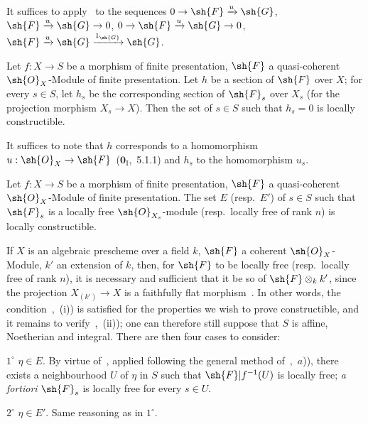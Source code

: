 It suffices to apply~ to the sequences $0\to\sh{F}\xrightarrow{u}\sh{G}$, $\sh{F}\xrightarrow{u}\sh{G}\to 0$, $0\to\sh{F}\xrightarrow{u}\sh{G}\to 0$, $\sh{F}\xrightarrow{u}\sh{G}\xrightarrow{1_\sh{G}}\sh{G}$.

\begin{corollary}[9.4.6]
\label{IV.9.4.6}
Let $f:X\to S$ be a morphism of finite presentation, $\sh{F}$ a quasi-coherent $\sh{O}_X$-Module of finite presentation.
Let $h$ be a section of $\sh{F}$ over $X$; for every $s\in S$, let $h_s$ be the corresponding section of $\sh{F}_s$ over $X_s$ \textnormal{(}for the projection morphism $X_s\to X$\textnormal{)}.
Then the set of $s\in S$ such that $h_s=0$ is locally constructible.
\end{corollary}

It suffices to note that $h$ corresponds to a homomorphism $u:\sh{O}_X\to\sh{F}$~($\mathbf{0}_{\mathrm{I}}$,~5.1.1) and $h_s$ to the homomorphism $u_s$.

\begin{proposition}[9.4.7]
\label{IV.9.4.7}
Let $f:X\to S$ be a morphism of finite presentation, $\sh{F}$ a quasi-coherent $\sh{O}_X$-Module of finite presentation.
The set $E$ \textnormal{(}resp.\ $E'$\textnormal{)} of $s\in S$ such that $\sh{F}_s$ is a locally free $\sh{O}_{X_s}$-module \textnormal{(}resp.\ locally free of rank $n$\textnormal{)} is locally constructible.
\end{proposition}

If $X$ is an algebraic prescheme over a field $k$, $\sh{F}$ a coherent $\sh{O}_X$-Module, $k'$ an extension of $k$, then, for $\sh{F}$ to be locally free (resp.\ locally free of rank $n$), it is necessary and sufficient that it be so of $\sh{F}\otimes_k k'$, since the projection $X_{(k')}\to X$ is a faithfully flat morphism~.
In other words, the condition~,~(i)) is satisfied for the properties we wish to prove constructible, and it remains to verify~,~(ii)); one can therefore still suppose that $S$ is affine, Noetherian and integral.
There are then four cases to consider:

$1^\circ$ $\eta\in E$.
By virtue of~, applied following the general method of~,~$a$)), there exists a neighbourhood $U$ of $\eta$ in $S$ such that $\sh{F}|f^{-1}(U)$ is locally free; \emph{a fortiori} $\sh{F}_s$ is locally free for every $s\in U$.

$2^\circ$ $\eta\in E'$.
Same reasoning as in $1^\circ$.

